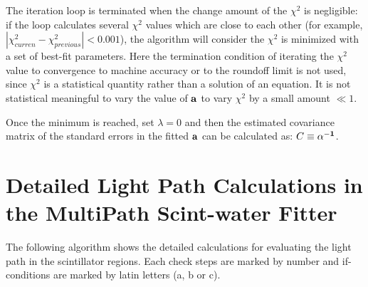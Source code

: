 The iteration loop is terminated when the change amount of the $\chi^2$ is negligible: if the loop calculates several $\chi^2$ values which are close to each other (for example, $|\chi^2_{curren}-\chi^2_{previous}|<0.001$), the algorithm will consider the $\chi^2$ is minimized with a set of best-fit parameters. Here the termination condition of iterating the $\chi^2$ value to convergence to machine
accuracy or to the roundoff limit is not used, since $\chi^2$ is a statistical quantity rather than a solution of an equation. It is not statistical meaningful to vary the value of $\bf a$ to vary $\chi^2$ by a small amount $\ll 1$.

Once the minimum is reached, set $\lambda=0$ and then the estimated covariance matrix of the standard errors in the fitted $\bf a$ can be calculated as: $C\equiv {\bf \alpha^{-1}}$.

\section{Detailed Light Path Calculations in the MultiPath Scint-water Fitter}\label{sect:lightpath}
The following algorithm shows the detailed calculations for evaluating the light path in the scintillator regions. Each check steps are marked by number and if-conditions are marked by latin letters (a, b or c). 

